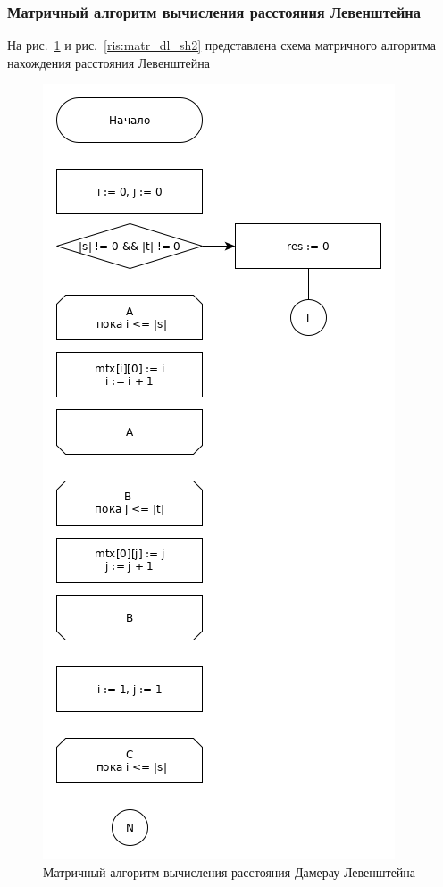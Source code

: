 \documentclass[a4paper,12pt]{article}
\begin{document}
    \afterpage{\FloatBarrier}
    \subsubsection{Матричный алгоритм вычисления расстояния Левенштейна}
            На рис.~\ref{ris:matr_dl_sh1} и рис.~\ref{ris:matr_dl_sh2} представлена схема матричного алгоритма нахождения расстояния Левенштейна
\begin{figure}[h]
		 			\centering
		 			{
		 				\includegraphics[scale=0.51]{dlm.png}
		 				\caption{Матричный алгоритм вычисления расстояния Дамерау-Левенштейна}
		 				\label{ris:matr_dl_sh1}
		 			}
		 		\end{figure}
\end{document}
